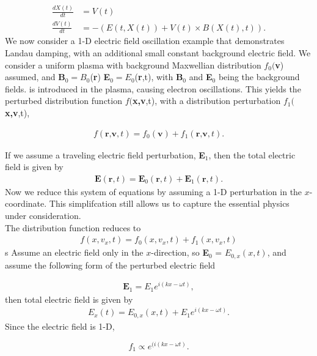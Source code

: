 \documentclass{article}
\begin{document}
\begin{align*}
\frac{d X(t)}{dt} &= V(t)\\
\frac{d V(t)}{dt} & = -(E(t,X(t)) + V(t)\times B(X(t),t)).
\end{align*}
\vspace{0.01cm}
\noindent
We now consider a 1-D electric field oscillation example that demonstrates Landau damping, with an additional small constant background electric field. We consider a uniform plasma with background Maxwellian distribution $f_{0}($\textbf{v}) assumed, and \textbf{B}$_0=B_0$(\textbf{r}) \textbf{E}$_0= E_0$(\textbf{r},t), with  \textbf{B}$_0$ and \textbf{E}$_0$ being the background fields. 
is introduced in the plasma, causing electron oscillations. This yields the perturbed distribution function $f($\textbf{x,v},t), with a distribution perturbation $f_1($\textbf{x,v},t), 

\begin{align*}
f(\textbf{r,v},t) = f_0(\textbf{v}) + f_1(\textbf{r,v},t).
\end{align*}

\noindent
If we assume a traveling electric field perturbation, \textbf{E}$_1$, then the total electric field is given by
\begin{align*}
\textbf{E}(\textbf{r},t) = \textbf{E}_0(\textbf{r},t) + \textbf{E}_{1}(\textbf{r},t).
\end{align*}
Now we reduce this system of equations by assuming a 1-D perturbation in the $x$-coordinate. This simplifcation still allows us to capture the essential physics under consideration.\\

The distribution function reduces to
\begin{align*}
f(x, v_x,t) = f_0(x,v_x,t) + f_1(x,v_x,t)
\end{align*}s
Assume an electric field only in the $x$-direction, so \textbf{E}$_0$ = $E_{0,x}(x,t)$, and assume the following form of the perturbed electric field

\begin{align*}
\textbf{E$_1$} = E_1e^{i(kx-\omega t)},
\end{align*}
then total electric field is given by 
\begin{align*}
E_x(t) = E_{0,x}(x,t) + E_1e^{i(kx-\omega t)}.
\end{align*}
Since the electric field is 1-D,

 $$f_1 \propto e^{(i(kx - \omega t)}.$$
\end{document}
